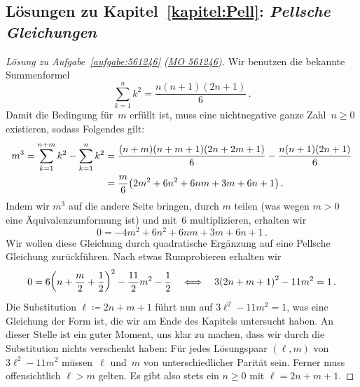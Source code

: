 \subsection*{Lösungen zu Kapitel~\ref{kapitel:Pell}: \emph{Pellsche Gleichungen}}

\begin{proof}[Lösung zu Aufgabe~\ref{aufgabe:561246} \textmd{(\href{https://www.mathematik-olympiaden.de/moev/index.php?option=com_download&thema=a&datei=A56124b.pdf&format=raw}{MO 561246})}]
	Wir benutzen die bekannte Summenformel
	\begin{equation*}
		\sum_{k=1}^nk^2=\frac{n(n+1)(2n+1)}{6}\,.
	\end{equation*}
	Damit die Bedingung für~$m$ erfüllt ist, muss eine nichtnegative ganze Zahl~$n\geqslant 0$ existieren, sodass Folgendes gilt:
	\begin{align*}
		m^3=\sum_{k=1}^{n+m}k^2-\sum_{k=1}^nk^2&=\frac{(n+m)(n+m+1)(2n+2m+1)}{6}-\frac{n(n+1)(2n+1)}{6}\\
		&=\frac{m}{6}\parens*{2m^2+6n^2+6nm+3m+6n+1}\,.
	\end{align*}
	Indem wir $m^3$ auf die andere Seite bringen, durch $m$ teilen (was wegen $m>0$ eine Äquivalenzumformung ist) und mit~$6$ multiplizieren, erhalten wir
	\begin{equation*}
		0=-4m^2+6n^2+6nm+3m+6n+1\,.
	\end{equation*}
	Wir wollen diese Gleichung durch quadratische Ergänzung auf eine Pellsche Gleichung zurückführen. Nach etwas Rumprobieren erhalten wir
	\begin{equation*}
		0=6\parens*{n+\frac{m}{2}+\frac12}^2-\frac{11}2m^2-\frac12\quad\Longleftrightarrow\quad 3\parens*{2n+m+1}^2-11m^2=1\,.
	\end{equation*}
	Die Substitution $\ell\coloneqq 2n+m+1$ führt nun auf $3\ell^2-11m^2=1$, was eine Gleichung der Form ist, die wir am Ende des Kapitels untersucht haben. An dieser Stelle ist ein guter Moment, uns klar zu machen, dass wir durch die Substitution nichts verschenkt haben: Für jedes Lösungspaar $(\ell,m)$ von $3\ell^2-11m^2$ müssen~$\ell$ und~$m$ von unterschiedlicher Parität sein. Ferner muss offensichtlich $\ell>m$ gelten. Es gibt also stets ein $n\geqslant 0$ mit $\ell=2n+m+1$.
	

\end{proof}
